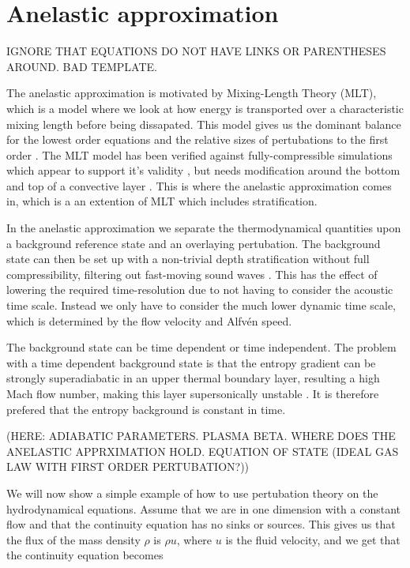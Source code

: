 \documentclass{article}
\begin{document}
\section{Anelastic approximation}

IGNORE THAT EQUATIONS DO NOT HAVE LINKS OR PARENTHESES AROUND. BAD TEMPLATE.

The anelastic approximation is motivated by Mixing-Length Theory (MLT), which is a model where we look at how energy is transported over a characteristic mixing length before being dissapated. This model gives us the dominant balance for the lowest order equations and the relative sizes of pertubations to the first order \citep{1999ApJS..121..247L}. The MLT model has been verified against fully-compressible simulations which appear to support it's validity \citep{1989ApJ...336.1022C}, but needs modification around the bottom and top of a convective layer \citep{1996ApJ...466..372C}. This is where the anelastic approximation comes in, which is a an extention of MLT which includes stratification. 

In the anelastic approximation we separate the thermodynamical quantities upon a background reference state and an overlaying pertubation. The background state can then be set up with a non-trivial depth stratification without full compressibility, filtering out fast-moving sound waves \citep{1999ApJS..121..247L}. This has the effect of lowering the required time-resolution due to not having to consider the acoustic time scale. Instead we only have to consider the much lower dynamic time scale, which is determined by the flow velocity and Alfvén speed. 

The background state can be time dependent \citep{1976ApJ...207..545T} or time independent. The problem with a time dependent background state is that the entropy gradient can be strongly superadiabatic in an upper thermal boundary layer, resulting a high Mach flow number, making this layer supersonically unstable \citep{1975JFM....68..695G}. It is therefore prefered that the entropy background is constant in time.

(HERE: ADIABATIC PARAMETERS. PLASMA BETA. WHERE DOES THE ANELASTIC APPRXIMATION HOLD. EQUATION OF STATE (IDEAL GAS LAW WITH FIRST ORDER PERTUBATION?))

We will now show a simple example of how to use pertubation theory on the hydrodynamical equations. Assume that we are in one dimension with a constant flow and that the continuity equation has no sinks or sources. This gives us that the flux of the mass density $\rho$ is $\rho u$, where $u$ is the fluid velocity, and we get that the continuity equation becomes
\end{document}
